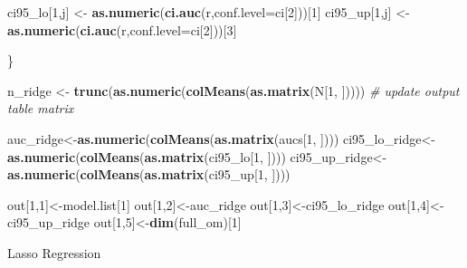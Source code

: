 \documentclass[
]{article}
\newenvironment{Shaded}{\begin{snugshade}}{\end{snugshade}}
\newcommand{\CommentTok}[1]{\textcolor[rgb]{0.56,0.35,0.01}{\textit{#1}}}
\newcommand{\DataTypeTok}[1]{\textcolor[rgb]{0.13,0.29,0.53}{#1}}
\newcommand{\DecValTok}[1]{\textcolor[rgb]{0.00,0.00,0.81}{#1}}
\newcommand{\KeywordTok}[1]{\textcolor[rgb]{0.13,0.29,0.53}{\textbf{#1}}}
\newcommand{\NormalTok}[1]{#1}
\newcommand{\StringTok}[1]{\textcolor[rgb]{0.31,0.60,0.02}{#1}}
\begin{document}
\begin{Shaded}
\begin{Highlighting}[]
\NormalTok{    ci95_lo[}\DecValTok{1}\NormalTok{,j] <-}\StringTok{ }\KeywordTok{as.numeric}\NormalTok{(}\KeywordTok{ci.auc}\NormalTok{(r,}\DataTypeTok{conf.level=}\NormalTok{ci[}\DecValTok{2}\NormalTok{]))[}\DecValTok{1}\NormalTok{]}
\NormalTok{    ci95_up[}\DecValTok{1}\NormalTok{,j] <-}\StringTok{ }\KeywordTok{as.numeric}\NormalTok{(}\KeywordTok{ci.auc}\NormalTok{(r,}\DataTypeTok{conf.level=}\NormalTok{ci[}\DecValTok{2}\NormalTok{]))[}\DecValTok{3}\NormalTok{]}

\NormalTok{\}}

\NormalTok{n_ridge <-}\StringTok{ }\KeywordTok{trunc}\NormalTok{(}\KeywordTok{as.numeric}\NormalTok{(}\KeywordTok{colMeans}\NormalTok{(}\KeywordTok{as.matrix}\NormalTok{(N[}\DecValTok{1}\NormalTok{, ])))) }\CommentTok{# update output table matrix}

\NormalTok{auc_ridge<-}\KeywordTok{as.numeric}\NormalTok{(}\KeywordTok{colMeans}\NormalTok{(}\KeywordTok{as.matrix}\NormalTok{(aucs[}\DecValTok{1}\NormalTok{, ])))}
\NormalTok{ci95_lo_ridge<-}\KeywordTok{as.numeric}\NormalTok{(}\KeywordTok{colMeans}\NormalTok{(}\KeywordTok{as.matrix}\NormalTok{(ci95_lo[}\DecValTok{1}\NormalTok{, ])))}
\NormalTok{ci95_up_ridge<-}\KeywordTok{as.numeric}\NormalTok{(}\KeywordTok{colMeans}\NormalTok{(}\KeywordTok{as.matrix}\NormalTok{(ci95_up[}\DecValTok{1}\NormalTok{, ])))}

\NormalTok{out[}\DecValTok{1}\NormalTok{,}\DecValTok{1}\NormalTok{]<-model.list[}\DecValTok{1}\NormalTok{]}
\NormalTok{out[}\DecValTok{1}\NormalTok{,}\DecValTok{2}\NormalTok{]<-auc_ridge}
\NormalTok{out[}\DecValTok{1}\NormalTok{,}\DecValTok{3}\NormalTok{]<-ci95_lo_ridge}
\NormalTok{out[}\DecValTok{1}\NormalTok{,}\DecValTok{4}\NormalTok{]<-ci95_up_ridge}
\NormalTok{out[}\DecValTok{1}\NormalTok{,}\DecValTok{5}\NormalTok{]<-}\KeywordTok{dim}\NormalTok{(full_om)[}\DecValTok{1}\NormalTok{]}
\end{Highlighting}
\end{Shaded}

Lasso Regression
\end{document}
